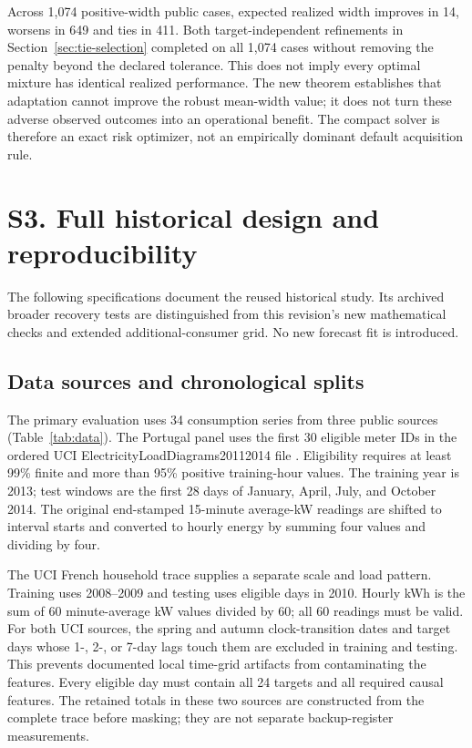 Across 1,074 positive-width public cases, expected realized width improves
in 14, worsens in 649 and ties in 411. Both target-independent refinements
in Section~\ref{sec:tie-selection} completed on all 1,074 cases without
removing the penalty beyond the declared tolerance. This does not imply
every optimal mixture has identical realized performance. The new theorem
establishes that adaptation cannot improve the robust mean-width value;
it does not turn these adverse observed outcomes into an operational benefit.
The compact solver is therefore an exact risk optimizer, not an empirically
dominant default acquisition rule.

\section{S3. Full historical design and reproducibility}\label{app:historical-design}
The following specifications document the reused historical study. Its
archived broader recovery tests are distinguished from this revision's
new mathematical checks and extended additional-consumer grid.
No new forecast fit is introduced.

\subsection{Data sources and chronological splits}
The primary evaluation uses 34 consumption series from three public sources
(Table~\ref{tab:data}). The Portugal panel uses the first 30 eligible meter
IDs in the ordered UCI ElectricityLoadDiagrams20112014 file \citep{portugal}.
Eligibility requires at least 99\% finite and more than 95\% positive
training-hour values. The training year is 2013; test windows are the first
28 days of January, April, July, and October 2014. The original end-stamped
15-minute average-kW readings are shifted to interval starts and converted
to hourly energy by summing four values and dividing by four.

The UCI French household trace \citep{uci} supplies a separate scale and
load pattern. Training uses 2008--2009 and testing uses eligible days in
2010. Hourly kWh is the sum of 60 minute-average kW values divided by 60;
all 60 readings must be valid. For both UCI sources, the spring and autumn
clock-transition dates and target days whose 1-, 2-, or 7-day lags touch
them are excluded in training and testing. This prevents documented local
time-grid artifacts from contaminating the features. Every eligible day
must contain all 24 targets and all required causal features. The retained
totals in these two sources are constructed from the complete trace before
masking; they are not separate backup-register measurements.

